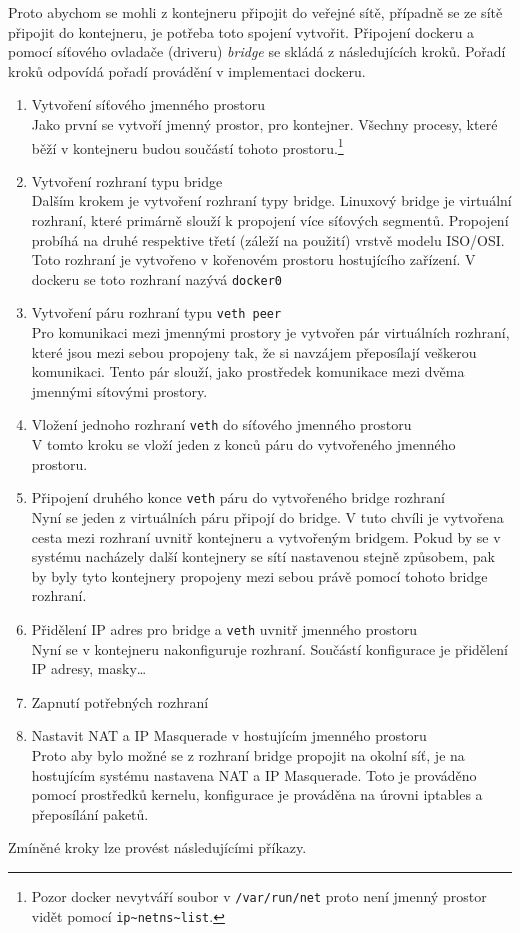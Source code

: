 

Proto abychom se mohli z kontejneru připojit do veřejné sítě, případně se ze sítě připojit do kontejneru, je potřeba toto spojení vytvořit. Připojení  dockeru a pomocí síťového ovladače (driveru) \textit{bridge} se skládá z následujících kroků. Pořadí kroků odpovídá pořadí provádění v implementaci dockeru.
\begin{enumerate}
\item Vytvoření síťového jmenného prostoru \\
Jako první se vytvoří jmenný prostor, pro kontejner. Všechny procesy, které běží v kontejneru budou součástí tohoto prostoru.\footnote{Pozor docker nevytváří soubor v \verb-/var/run/net- proto není jmenný prostor vidět pomocí \verb-ip~netns~list-.}
\item Vytvoření rozhraní typu bridge \\
Dalším krokem je vytvoření rozhraní typy bridge. Linuxový bridge je virtuální rozhraní, které primárně slouží k propojení více síťových segmentů. Propojení probíhá na druhé respektive třetí (záleží na použití) vrstvě modelu ISO/OSI. Toto rozhraní je vytvořeno v kořenovém prostoru hostujícího zařízení. V dockeru se toto rozhraní nazývá \verb|docker0|
\item Vytvoření páru rozhraní typu \verb|veth peer|\\
Pro komunikaci mezi jmennými prostory je vytvořen pár virtuálních rozhraní, které jsou mezi sebou propojeny tak, že si navzájem přeposílají veškerou komunikaci. Tento pár slouží, jako prostředek komunikace mezi dvěma jmennými sítovými prostory.
\item Vložení jednoho rozhraní \verb|veth| do síťového jmenného prostoru \\
V tomto kroku se vloží jeden z konců páru do vytvořeného jmenného prostoru. 
\item Připojení druhého konce \verb|veth| páru do vytvořeného bridge rozhraní \\
Nyní se jeden z virtuálních páru připojí do bridge. V tuto chvíli je vytvořena cesta mezi rozhraní uvnitř kontejneru a vytvořeným bridgem. Pokud by se v systému nacházely další kontejnery se sítí nastavenou stejně způsobem, pak by byly tyto kontejnery propojeny mezi sebou právě pomocí tohoto bridge rozhraní.
\item Přidělení IP adres pro bridge a \verb|veth| uvnitř jmenného prostoru \\
Nyní se v kontejneru nakonfiguruje rozhraní. Součástí konfigurace je přidělení IP adresy, masky\ldots  
\item Zapnutí potřebných rozhraní\\
\item Nastavit NAT a IP Masquerade v hostujícím jmenného prostoru\\
Proto aby bylo možné se z rozhraní bridge propojit na okolní síť, je na hostujícím systému nastavena NAT a IP Masquerade. Toto je prováděno pomocí prostředků kernelu, konfigurace je prováděna na úrovni iptables a přeposílání paketů.
\end{enumerate}
Zmíněné kroky lze provést následujícími příkazy.

